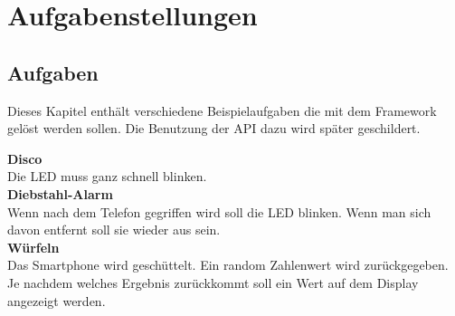 \documentclass[11pt,a4paper]{report}
\begin{document}

\chapter{Aufgabenstellungen} \label{chap:Experimente}

\section{Aufgaben}
Dieses Kapitel enthält verschiedene Beispielaufgaben die mit dem Framework gelöst werden sollen.
Die Benutzung der API dazu wird später geschildert.


\textbf{Disco}\\
Die LED muss ganz schnell blinken.
\\

\textbf{Diebstahl-Alarm}\\
Wenn nach dem Telefon gegriffen wird soll die LED blinken.
Wenn man sich davon entfernt soll sie wieder aus sein.
\\

\textbf{Würfeln}\\
Das Smartphone wird geschüttelt.
Ein random Zahlenwert wird zurückgegeben.
Je nachdem welches Ergebnis zurückkommt soll ein Wert auf dem Display angezeigt werden.
\\
\end{document}
